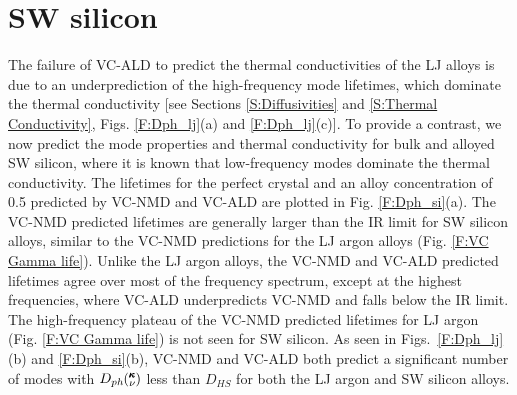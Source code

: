 \documentclass[aps,prb,onecolumn,preprint,footinbib,superscriptaddress,amsmath,amssymb,floatfix]{revtex4}
\newcommand{\kv}{\mspace{-4.0mu}\left(\mspace{-8.0mu}
\begin{smallmatrix}&\pmb{\kappa} \\&\nu\end{smallmatrix}
\mspace{-3.0mu}\right)}
\begin{document}

\clearpage

\section{\label{S:SW}SW silicon}

The failure of VC-ALD to predict the thermal conductivities of the LJ 
alloys is due to an underprediction of the high-frequency mode lifetimes, 
which dominate the thermal conductivity 
[see Sections \ref{S:Diffusivities} and \ref{S:Thermal Conductivity}, 
Figs. \ref{F:Dph_lj}(a) and \ref{F:Dph_lj}(c)]. To provide a contrast, 
we now predict the mode properties and thermal conductivity for bulk 
and alloyed SW silicon, where it is known that low-frequency modes 
dominate the thermal conductivity.
\cite{sellan_size_2010,sellan_cross-plane_2010} 
The lifetimes for the perfect crystal and an alloy concentration of 
0.5 predicted by VC-NMD and VC-ALD are plotted in Fig. \ref{F:Dph_si}(a). 
The VC-NMD predicted lifetimes are generally larger than 
the IR limit for SW silicon alloys, similar 
to the VC-NMD predictions for the LJ argon alloys 
(Fig. \ref{F:VC Gamma life}). Unlike the 
LJ argon alloys, the  
VC-NMD and VC-ALD predicted lifetimes agree over most 
of the frequency spectrum, except at the highest frequencies, where 
VC-ALD underpredicts VC-NMD and falls below the IR limit. 
The high-frequency plateau of the VC-NMD predicted lifetimes 
for LJ argon (Fig. \ref{F:VC Gamma life}) is not seen for SW silicon. 
As seen in Figs.~\ref{F:Dph_lj}(b) 
and \ref{F:Dph_si}(b), VC-NMD and VC-ALD both predict a significant 
number of modes with  
$D_{ph}\kv$ less than $D_{HS}$ for both the LJ argon and 
SW silicon alloys. 
\end{document}
